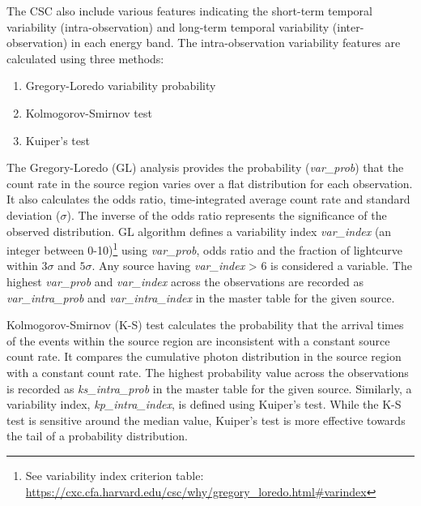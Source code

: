 \documentclass[fleqn,usenatbib]{mnras}
\begin{document}
 The CSC also include various features indicating the short-term temporal variability (intra-observation) and long-term temporal variability (inter-observation) in each energy band. 
The intra-observation variability features are calculated using three methods:
 \begin{enumerate}
     \item Gregory-Loredo variability probability
     \item Kolmogorov-Smirnov test
     \item Kuiper's test 
 \end{enumerate}

The Gregory-Loredo (GL) \citep{1992ApJ...398..146G} analysis provides the probability ({\em var\_prob}) that the count rate in the source region varies over a flat distribution for each observation. 
It also calculates the odds ratio, time-integrated average count rate and standard deviation ($\sigma$). The inverse of the odds ratio represents the significance of the observed distribution. GL algorithm defines a variability index {\em var\_index} (an integer between 0-10)\footnote{See variability index criterion table: \url{https://cxc.cfa.harvard.edu/csc/why/gregory\_loredo.html\#varindex}} using {\em var\_prob}, odds ratio and the fraction of lightcurve within $3\sigma$ and $5\sigma$. Any source having {\em var\_index} > 6 is considered a variable. The highest {\em var\_prob} and {\em var\_index} across the observations are recorded as {\em var\_intra\_prob} and {\em var\_intra\_index} in the master table for the given source.

 Kolmogorov-Smirnov (K-S) test calculates the probability that the arrival times of the events within the source region are inconsistent with a constant source count rate. It compares the cumulative photon distribution in the source region with a constant count rate. 
 The highest probability value across the observations is recorded as {\em ks\_intra\_prob} in the master table for the given source. Similarly, a variability index, {\em kp\_intra\_index}, is defined using Kuiper's test. While the K-S test is sensitive around the median value, Kuiper's test is more effective towards the tail of a probability distribution.
 
\end{document}
